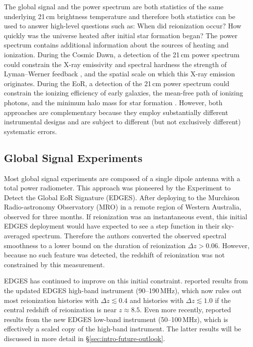 \begin{bibunit}
The global signal and the power spectrum are both statistics of the same underlying 21\,cm
brightness temperature and therefore both statistics can be used to answer high-level questions such
as: When did reionization occur? How quickly was the universe heated after initial star formation
began?  The power spectrum contains additional information about the sources of heating and
ionization.  During the Cosmic Dawn, a detection of the 21\,cm power spectrum could constrain the
X-ray emissivity and spectral hardness \citep{2014MNRAS.437L..36F} the strength of Lyman--Werner
feedback \citep{2013MNRAS.432.2909F}, and the spatial scale on which this X-ray emission originates.
During the EoR, a detection of the 21\,cm power spectrum could constrain the ionizing efficiency of
early galaxies, the mean-free path of ionizing photons, and the minimum halo mass for star formation
\citep{2015MNRAS.449.4246G}.  However, both approaches are complementary because they employ
substantially different instrumental designs and are subject to different (but not exclusively
different) systematic errors.

\subsection{Global Signal Experiments}

Most global signal experiments are composed of a single dipole antenna with a total power
radiometer. This approach was pioneered by the Experiment to Detect the Global EoR Signature
(EDGES). After deploying to the Murchison Radio-astronomy Observatory (MRO) in a remote region of
Western Australia, \citet{2010Natur.468..796B} observed for three months. If reionization was an
instantaneous event, this initial EDGES deployment would have expected to see a step function in
their sky-averaged spectrum. Therefore the authors converted the observed spectral smoothness to a
lower bound on the duration of reionization $\Delta z > 0.06$. However, because no such feature was
detected, the redshift of reionization was not constrained by this measurement.

EDGES has continued to improve on this initial constraint.  \citet{2017ApJ...847...64M} reported
results from the updated EDGES high-band instrument (90--190\,MHz), which now rules out most
reionization histories with $\Delta z \lesssim 0.4$ and histories with $\Delta z \lesssim 1.0$ if
the central redshift of reionization is near $z\approx 8.5$. Even more recently,
\citet{2018Natur.555...67B} reported results from the new EDGES low-band instrument (50--100\,MHz),
which is effectively a scaled copy of the high-band instrument. The latter results will be discussed
in more detail in \S\ref{sec:intro-future-outlook}.


\end{bibunit}
